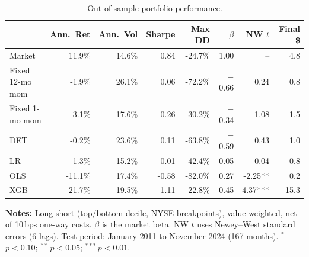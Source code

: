 \begin{table}[htbp]
\centering
\small
\begin{tabular}{l r r r r r r r}
\toprule
 & Ann.\ Ret & Ann.\ Vol & Sharpe & Max DD & $\beta$ & NW $t$ & Final \$ \\
\midrule
Market & 11.9\% & 14.6\% & 0.84 & -24.7\% & 1.00 & -- & 4.8 \\
\midrule
Fixed 12-mo mom & -1.9\% & 26.1\% & 0.06 & -72.2\% & $-$0.66 & 0.24 & 0.8 \\
Fixed 1-mo mom & 3.1\% & 17.6\% & 0.26 & -30.2\% & $-$0.34 & 1.08 & 1.5 \\
DET & -0.2\% & 23.6\% & 0.11 & -63.8\% & $-$0.59 & 0.43 & 1.0 \\
LR & -1.3\% & 15.2\% & -0.01 & -42.4\% & 0.05 & -0.04 & 0.8 \\
OLS & -11.1\% & 17.4\% & -0.58 & -82.0\% & 0.27 & -2.25** & 0.2 \\
XGB & 21.7\% & 19.5\% & 1.11 & -22.8\% & 0.45 & 4.37*** & 15.3 \\
\bottomrule
\end{tabular}
\caption{Out-of-sample portfolio performance.}
\label{tab:performance}

\medskip
\small
\textbf{Notes:} Long-short (top/bottom decile, NYSE breakpoints), value-weighted, net of 10\,bps one-way costs. $\beta$ is the market beta. NW $t$ uses Newey--West standard errors (6 lags). Test period: January 2011 to November 2024 (167 months). $^{*}$\,$p<0.10$; $^{**}$\,$p<0.05$; $^{***}$\,$p<0.01$.
\end{table}